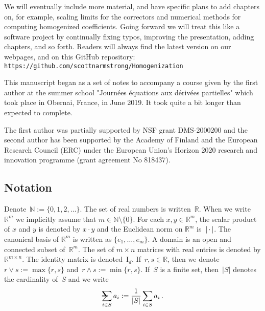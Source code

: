 \documentclass[11pt]{article} %
\makeatletter
\numberwithin{equation}{section}
\theoremstyle{definition}
\let\originalleft\left
\let\originalright\right
\renewcommand{\left}{\mathopen{}\mathclose\bgroup\originalleft}
\renewcommand{\right}{\aftergroup\egroup\originalright}
\newcommand*{\Id}{\ensuremath{\mathrm{I}_d}}
\newcommand*{\N}{\ensuremath{\mathbb{N}}}
\newcommand*{\R}{\ensuremath{\mathbb{R}}}
\newcommand{\avsum}{\mathop{\mathpalette\avsuminner\relax}\displaylimits}
\newcommand\avsuminner[2]{%
  {\sbox0{$\m@th#1\sum$}%
   \vphantom{\usebox0}%
   \ooalign{%
     \hidewidth
     \smash{\,\rule[.23em]{8.8pt}{1.1pt} \relax}%
     \hidewidth\cr
     $\m@th#1\sum$\cr
   }%
  }%
}
\makeatother
\begin{document}
\smallskip

We will eventually include more material, and have specific plans to add chapters on, for example, scaling limits for the correctors and numerical methods for computing homogenized coefficients. Going forward we will treat this like a software project by continually fixing typos, improving the presentation, adding chapters, and so forth. Readers will always find the latest version on our webpages, and on this GitHub repository: 
{\tt https://github.com/scottnarmstrong/Homogenization}

\smallskip


This manuscript began as a set of notes to accompany a course given by the first author at the summer school "Journ\'ees \'equations aux d\'eriv\'ees partielles" which took place in Obernai, France, in June 2019. It took quite a bit longer than expected to complete. 

\smallskip

The first author was partially supported by NSF grant DMS-2000200 and the second author has been supported by the Academy of Finland and the European Research Council (ERC) under the European Union's Horizon 2020 research and innovation programme (grant agreement No 818437).


\subsection*{Notation}

Denote~$\N:=\{0,1,2,\ldots\}$. The set of real numbers is written~$\R$. When we write $\R^m$ we implicitly assume that $m\in\N\setminus\{0\}$. For each  $x,y\in\R^m$, the scalar product of $x$ and $y$ is denoted by $x\cdot y$ and the Euclidean norm on $\R^m$ is~$\left| \,\cdot\, \right|$. The canonical basis of $\R^m$ is written as $\{e_1,\ldots,e_m\}$. A domain is an open and connected subset of~$\R^m$.  The set of $m\times n$ matrices with real entries is denoted by $\R^{m\times n}$. The identity matrix is denoted~$\Id$. If~$r,s\in \R$, then we denote~$r\vee s := \max\{ r,s \}$ and~$r\wedge s := \min\{r,s\}$. If~$S$ is a finite set, then~$|S|$ denotes the cardinality of~$S$ and we write
\begin{equation}
\label{e.slashedsum}
\avsum_{i \in S} a_i := \frac{1}{|S|} \sum_{i\in S} a_i 
\,.
\end{equation}

\smallskip
\end{document}
